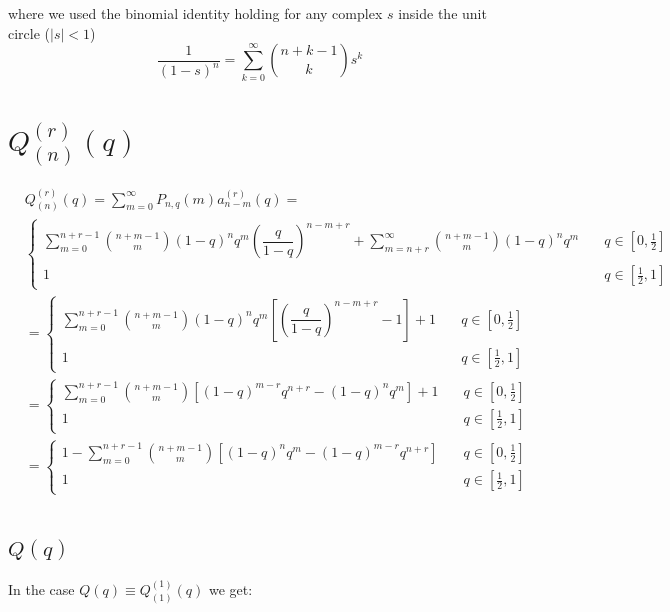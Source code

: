 \documentclass[letterpaper,12pt]{report}
\begin{document}
where we used the binomial identity holding for any complex $s$ inside the unit circle ($|s|<1$)
\begin{equation}\label{eq:binident}\nonumber
\dfrac{1}{(1-s)^n}=\sum_{k=0}^{\infty} {n + k -1\choose k}s^k
\end{equation}


\section{$\mathit{Q_{(n)}^{(r)}}(q)$ } \label{app:calcqofq} 

\begin{eqnarray}\label{eq:qngeneral}\nonumber
&\mathit{Q}_{(n)}^{(r)}(q)=\sum_{m=0}^{\infty}\mathit{P}_{n,q}(m)\mathit{a}^{(r)}_{n-m}(q)=\\ \nonumber
&
\begin{cases}
\sum_{m=0}^{n+r-1}{n + m -1\choose m}(1-q)^nq^m\left(\dfrac{q}{1-q}\right)^{n-m+r}+ \sum_{m=n+r}^{\infty}{n + m -1\choose m}(1-q)^nq^m & \quad q \in [0,\frac{1}{2}] \\ 
1 & \quad q \in [\frac{1}{2},1] 
\end{cases} \\ \nonumber
&=
\begin{cases}
\sum_{m=0}^{n+r-1}{n + m -1\choose m}(1-q)^nq^m\left[\left(\dfrac{q}{1-q}\right)^{n-m+r}-1\right]+ 1 & \quad q \in [0,\frac{1}{2}] \\
1 & \quad q \in [\frac{1}{2},1] 
\end{cases} \\ \nonumber
&=
\begin{cases}
\sum_{m=0}^{n+r-1}{n + m -1\choose m}\left[(1-q)^{m-r}q^{n+r} - (1-q)^nq^m\right]+ 1 & \quad q \in [0,\frac{1}{2}] \\
1 & \quad q \in [\frac{1}{2},1] 
\end{cases} \\ \nonumber
&=
\begin{cases}
1-\sum_{m=0}^{n+r-1}{n + m -1\choose m}\left[(1-q)^nq^m-(1-q)^{m-r}q^{n+r}\right] & \quad q \in [0,\frac{1}{2}] \\
1 & \quad q \in [\frac{1}{2},1] 
\end{cases} \\ \nonumber
\end{eqnarray}

\subsection{$\mathit{Q}(q)$}\label{app:qofq}
In the case $\mathit{Q}(q)\equiv\mathit{Q_{(1)}^{(1)}}(q)$ we get:
\end{document}
